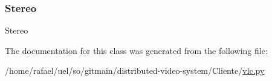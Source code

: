 \mbox{\label{classvlc_1_1_audio_output_channel_a0efd4e24b2435aff80b5a5bac9b6cff1}} 
\subsubsection{\texorpdfstring{Stereo}{Stereo}}
{\footnotesize\ttfamily Stereo\hspace{0.3cm}{\ttfamily [static]}}



The documentation for this class was generated from the following file\+:\begin{DoxyCompactItemize}
\item 
/home/rafael/uel/so/gitmain/distributed-\/video-\/system/\+Cliente/\hyperlink{vlc_8py}{vlc.\+py}\end{DoxyCompactItemize}
